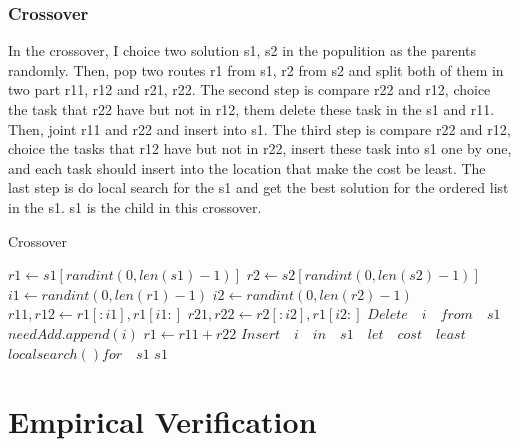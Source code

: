 \documentclass[conference,compsoc]{IEEEtran}
\begin{document}
    \subsubsection{Crossover}
    In the crossover, I choice two solution s1, s2 in the populition as the parents randomly. Then, pop two routes r1 from s1, r2 from s2 and split both of them in two part r11, r12 and r21, r22.
    The second step is compare r22 and r12, choice the task that r22 have but not in r12, them delete these task in the s1 and r11. Then, joint r11 and r22 and insert into s1.
    The third step is compare r22 and r12, choice the tasks that r12 have but not in r22, insert these task into s1 one by one, and each task should insert into the location that make the cost be least.
    The last step is do local search for the s1 and get the best solution for the ordered list in the s1. s1 is the child in this crossover.
    \begin{algorithm}
      \caption{Crossover}
      \begin{algorithmic}[1]
          \State $r1 \gets s1[randint(0, len(s1)-1)]$
          \State $r2 \gets s2[randint(0, len(s2)-1)]$
          \State $i1 \gets randint(0, len(r1)-1)$
          \State $i2 \gets randint(0,len(r2)-1)$
          \State $r11,r12 \gets r1[:i1],r1[i1:]$
          \State $r21,r22 \gets r2[:i2],r1[i2:]$          
              \State$Delete\quad i\quad from\quad s1$
            \EndIf
          \EndFor 
              \State $needAdd.append(i)$
            \EndIf
          \EndFor
          \State $r1\gets r11+r22$
            \State $Insert\quad i\quad in\quad s1\quad let \quad cost\quad least$
          \EndFor
          \State $localsearch()for\quad s1$
          \State \Return $s1$
        \EndFunction
      \end{algorithmic}
    \end{algorithm}
\section{Empirical Verification}
\end{document}
